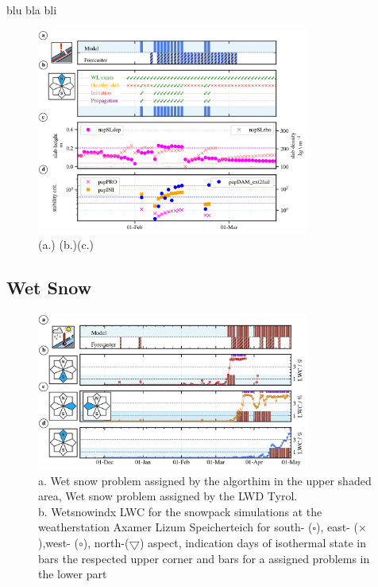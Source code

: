 blu bla bli

\begin{figure}[h]
    \centering
    \includegraphics[width=0.8\textwidth]{Figures/figures_avapro/AXLIZ/persitent_N_detail_AXLIZ.png}
    \caption{ (a.) 
     (b.)(c.) 
     }
    \label{fig:PAP_N_detail_AXLIZ}

\end{figure}



\subsection{Wet Snow}


\begin{figure}[h]
    \centering
    \includegraphics[width=0.8\textwidth]{Figures/figures_avapro/AXLIZ/wet_snow_AXLIZ.png}
    \caption{ a. Wet snow problem assigned by the algorthim in the upper shaded area, Wet snow problem assigned by the LWD Tyrol.  \\
     b. Wetsnowindx LWC for the snowpack simulations at the weatherstation Axamer Lizum Speicherteich for south- ($ \square$), 
     east- ($\times$),west- ($\circ$), north-($\bigtriangledown$) aspect, indication days of isothermal state in bars the respected
     upper corner and bars for a assigned problems in the lower part}
    \label{fig:avapro_AXLIZ_wet}
\end{figure}

